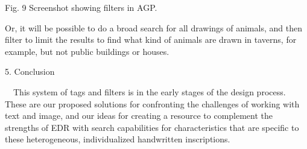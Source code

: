 \documentclass[amsthm,ebook]{saparticle}
\begin{document}
Fig. 9 Screenshot showing filters in AGP.


\bigskip

Or, it will be possible to do a broad search for all drawings of animals, and then filter to limit the results to find
what kind of animals are drawn in taverns, for example, but not public buildings or houses. \ 


\bigskip

5. Conclusion

\ \ This system of tags and filters is in the early stages of the design process. These are our proposed solutions for
confronting the challenges of working with text and image, and our ideas for creating a resource to complement the
strengths of EDR with search capabilities for characteristics that are specific to these heterogeneous, individualized
handwritten inscriptions. 




\end{document}
